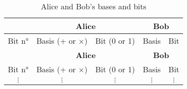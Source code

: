 \begin{longtable}{c|cc|cc}
  \caption{Alice and Bob's bases and bits}
  \label{tab:aeb}\\
  \toprule
        & \multicolumn{2}{c|}{\textbf{Alice}} & \multicolumn{2}{c}{\textbf{Bob}}                  \\
  \midrule
  Bit n° & Basis (+ or $\times$)      & Bit (0 or 1)            & Basis    & Bit \\ \hline

  \endfirsthead %

  \toprule
        & \multicolumn{2}{c|}{\textbf{Alice}} & \multicolumn{2}{c}{\textbf{Bob}}                  \\
  \midrule
  Bit n° & Basis (+ or $\times$)      & Bit (0 or 1)            & Basis    & Bit \\ \hline
  $\vdots$ & $\vdots$                 & $\vdots$                & $\vdots$ & $\vdots$ \\


\end{longtable}

